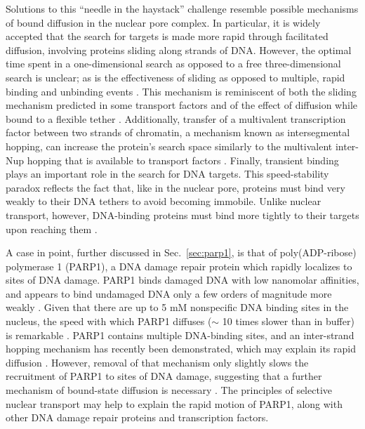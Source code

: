Solutions to this ``needle in the haystack'' challenge resemble possible mechanisms of bound diffusion in the nuclear pore complex.  In particular, it is widely accepted that the search for targets is made more rapid through facilitated diffusion, involving proteins sliding along strands of DNA.  However, the optimal time spent in a one-dimensional search as opposed to a free three-dimensional search is unclear; as is the effectiveness of sliding as opposed to multiple, rapid binding and unbinding events \cite{halford09}.  This mechanism is reminiscent of both the sliding mechanism predicted in some transport factors and of the effect of diffusion while bound to a flexible tether \cite{raveh16}.  Additionally, transfer of a multivalent transcription factor between two strands of chromatin, a mechanism known as intersegmental hopping, can increase the protein's search space similarly to the multivalent inter-Nup hopping that is available to transport factors \cite{doucleff08,halford04a}.  Finally, transient binding plays an important role in the search for DNA targets.  This speed-stability paradox reflects the fact that, like in the nuclear pore, proteins must bind very weakly to their DNA tethers to avoid becoming immobile.  Unlike nuclear transport, however, DNA-binding proteins must bind more tightly to their targets upon reaching them \cite{iwahara13,zandarashvili15}.

A case in point, further discussed in Sec.~\ref{sec:parp1}, is that of poly(ADP-ribose) polymerase 1 (PARP1), a DNA damage repair protein which rapidly localizes to sites of DNA damage.  PARP1 binds damaged DNA with low nanomolar affinities, and appears to bind undamaged DNA only a few orders of magnitude more weakly \cite{sukhanova16}.  Given that there are up to 5 mM nonspecific DNA binding sites in the nucleus, the speed with which PARP1 diffuses ($\sim$ 10 times slower than in buffer) is remarkable \cite{iwahara13}.  PARP1 contains multiple DNA-binding sites, and an inter-strand hopping mechanism has recently been demonstrated, which may explain its rapid diffusion \cite{rudolph18}.  However, removal of that mechanism only slightly slows the recruitment of PARP1 to sites of DNA damage, suggesting that a further mechanism of bound-state diffusion is necessary \cite{mahadevan18}.  The principles of selective nuclear transport may help to explain the rapid motion of PARP1, along with other DNA damage repair proteins and transcription factors.


